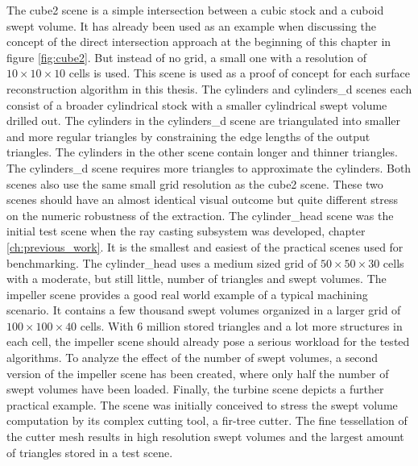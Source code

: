 The cube2 scene is a simple intersection between a cubic stock and a cuboid swept volume.
It has already been used as an example when discussing the concept of the direct intersection approach at the beginning of this chapter in figure \ref{fig:cube2}.
But instead of no grid, a small one with a resolution of $10\times10\times10$ cells is used.
This scene is used as a proof of concept for each surface reconstruction algorithm in this thesis.
%
The cylinders and cylinders\_d scenes each consist of a broader cylindrical stock with a smaller cylindrical swept volume drilled out.
The cylinders in the cylinders\_d scene are triangulated into smaller and more regular triangles by constraining the edge lengths of the output triangles.
The cylinders in the other scene contain longer and thinner triangles.
The cylinders\_d scene requires more triangles to approximate the cylinders.
Both scenes also use the same small grid resolution as the cube2 scene.
These two scenes should have an almost identical visual outcome but quite different stress on the numeric robustness of the extraction.
%
The cylinder\_head scene was the initial test scene when the ray casting subsystem was developed, \cf chapter \ref{ch:previous_work}.
It is the smallest and easiest of the practical scenes used for benchmarking.
The cylinder\_head uses a medium sized grid of $50\times50\times30$ cells with a moderate, but still little, number of triangles and swept volumes.
%
The impeller scene provides a good real world example of a typical machining scenario.
It contains a few thousand swept volumes organized in a larger grid of $100\times100\times40$ cells.
With 6 million stored triangles and a lot more structures in each cell, the impeller scene should already pose a serious workload for the tested algorithms.
To analyze the effect of the number of swept volumes, a second version of the impeller scene has been created, where only half the number of swept volumes have been loaded.
%
Finally, the turbine scene depicts a further practical example.
The scene was initially conceived to stress the swept volume computation by its complex cutting tool, a fir-tree cutter.
The fine tessellation of the cutter mesh results in high resolution swept volumes and the largest amount of triangles stored in a test scene.

